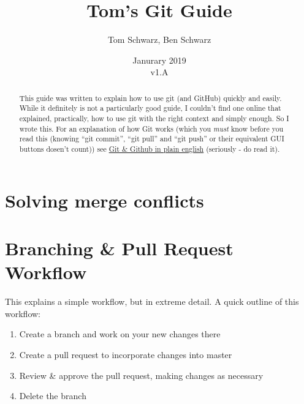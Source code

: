 \documentclass[a4paper, titlepage]{article}
\title{Tom's Git Guide}
\author{Tom Schwarz, Ben Schwarz}
\date{Janurary 2019\\v1.A} %
\begin{document}
\maketitle

\tableofcontents

\renewcommand{\abstractname}{Introduction} %
\begin{abstract}
This guide was written to explain how to use git (and GitHub) quickly and easily. While it definitely is not a particularly good guide, I couldn't find one online that explained, practically, how to use git with the right context and simply enough. So I wrote this. For an explanation of how Git works (which you \emph{must} know before you read this (knowing ``git commit'', ``git pull'' and ``git push'' or their equivalent GUI buttons dosen't count)) see \href{https://blog.red-badger.com/2016/11/29/gitgithub-in-plain-english}{Git \& Github in plain english} (seriously - do read it).
\end{abstract}

\section{Solving merge conflicts}

\section{Branching \& Pull Request Workflow}
This explains a simple workflow, but in extreme detail. A quick outline of this workflow:
\begin{enumerate}
	\item Create a branch and work on your new changes there
	\item Create a pull request to incorporate changes into master
	\item Review \& approve the pull request, making changes as necessary
	\item Delete the branch
\end{enumerate}
\end{document}
